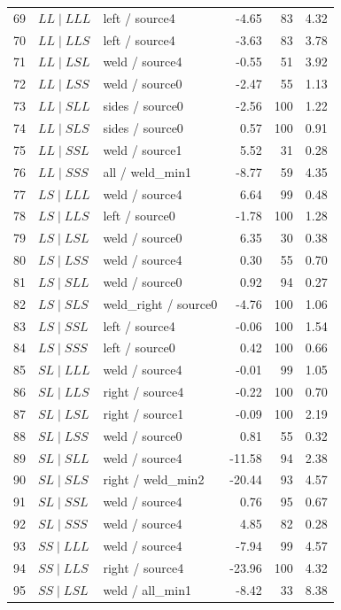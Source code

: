 \begin{longtable}{@{}r>{\raggedright\arraybackslash}p{.28\linewidth}>{\raggedright\arraybackslash}p{.27\linewidth}rrr@{}}
69 & $LL\mid LLL$ & left / source4 & -4.65 & 83 & 4.32\\
70 & $LL\mid LLS$ & left / source4 & -3.63 & 83 & 3.78\\
71 & $LL\mid LSL$ & weld / source4 & -0.55 & 51 & 3.92\\
72 & $LL\mid LSS$ & weld / source0 & -2.47 & 55 & 1.13\\
73 & $LL\mid SLL$ & sides / source0 & -2.56 & 100 & 1.22\\
74 & $LL\mid SLS$ & sides / source0 & 0.57 & 100 & 0.91\\
75 & $LL\mid SSL$ & weld / source1 & 5.52 & 31 & 0.28\\
76 & $LL\mid SSS$ & all / weld\_\allowbreak min1 & -8.77 & 59 & 4.35\\
77 & $LS\mid LLL$ & weld / source4 & 6.64 & 99 & 0.48\\
78 & $LS\mid LLS$ & left / source0 & -1.78 & 100 & 1.28\\
79 & $LS\mid LSL$ & weld / source0 & 6.35 & 30 & 0.38\\
80 & $LS\mid LSS$ & weld / source4 & 0.30 & 55 & 0.70\\
81 & $LS\mid SLL$ & weld / source0 & 0.92 & 94 & 0.27\\
82 & $LS\mid SLS$ & weld\_\allowbreak right / source0 & -4.76 & 100 & 1.06\\
83 & $LS\mid SSL$ & left / source4 & -0.06 & 100 & 1.54\\
84 & $LS\mid SSS$ & left / source0 & 0.42 & 100 & 0.66\\
85 & $SL\mid LLL$ & weld / source4 & -0.01 & 99 & 1.05\\
86 & $SL\mid LLS$ & right / source4 & -0.22 & 100 & 0.70\\
87 & $SL\mid LSL$ & right / source1 & -0.09 & 100 & 2.19\\
88 & $SL\mid LSS$ & weld / source0 & 0.81 & 55 & 0.32\\
89 & $SL\mid SLL$ & weld / source4 & -11.58 & 94 & 2.38\\
90 & $SL\mid SLS$ & right / weld\_\allowbreak min2 & -20.44 & 93 & 4.57\\
91 & $SL\mid SSL$ & weld / source4 & 0.76 & 95 & 0.67\\
92 & $SL\mid SSS$ & weld / source4 & 4.85 & 82 & 0.28\\
93 & $SS\mid LLL$ & weld / source4 & -7.94 & 99 & 4.57\\
94 & $SS\mid LLS$ & right / source4 & -23.96 & 100 & 4.32\\
95 & $SS\mid LSL$ & weld / all\_\allowbreak min1 & -8.42 & 33 & 8.38\\

\end{longtable}
